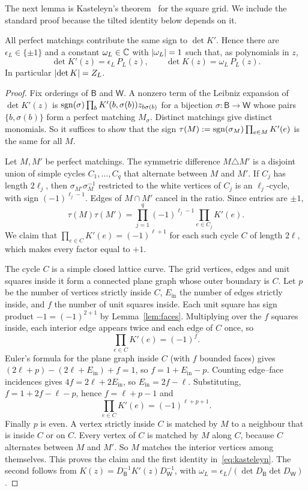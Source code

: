 The next lemma is Kasteleyn's theorem~\cite{Kasteleyn61} for the square grid. We include the standard proof because the tilted identity below depends on it.

\begin{lemma}\label{lem:common-phase}
All perfect matchings contribute the same sign to $\det K'$. Hence there are $\epsilon_L\in\{\pm1\}$ and a constant $\omega_L\in\mathbb{C}$ with $\lvert \omega_L\rvert=1$ such that, as polynomials in $z$,
\begin{equation}\label{eq:kasteleyn}
  \det K'(z)=\epsilon_L\,P_L(z),\qquad \det K(z)=\omega_L\,P_L(z).
\end{equation}
In particular $\lvert \det K\rvert=Z_L$.
\end{lemma}

\begin{proof}
Fix orderings of $\mathsf B$ and $\mathsf W$. A nonzero term of the Leibniz expansion of $\det K'(z)$ is $\operatorname{sgn}(\sigma)\prod_bK'(b,\sigma(b))z_{b\sigma(b)}$ for a bijection $\sigma:\mathsf B\to\mathsf W$ whose pairs $\{b,\sigma(b)\}$ form a perfect matching $M_\sigma$. Distinct matchings give distinct monomials. So it suffices to show that the sign $\tau(M):=\operatorname{sgn}(\sigma_M)\prod_{e\in M}K'(e)$ is the same for all $M$.

Let $M,M'$ be perfect matchings. The symmetric difference $M\triangle M'$ is a disjoint union of simple cycles $C_1,\dots,C_q$ that alternate between $M$ and $M'$. If $C_j$ has length $2\ell_j$, then $\sigma_{M'}\sigma_M^{-1}$ restricted to the white vertices of $C_j$ is an $\ell_j$-cycle, with sign $(-1)^{\ell_j-1}$. Edges of $M\cap M'$ cancel in the ratio. Since entries are $\pm1$,
\[
  \tau(M)\tau(M')=\prod_{j=1}^q(-1)^{\ell_j-1}\prod_{e\in C_j}K'(e).
\]
We claim that $\prod_{e\in C}K'(e)=(-1)^{\ell+1}$ for each such cycle $C$ of length $2\ell$, which makes every factor equal to $+1$.

The cycle $C$ is a simple closed lattice curve. The grid vertices, edges and unit squares inside it form a connected plane graph whose outer boundary is $C$. Let $p$ be the number of vertices strictly inside $C$, $E_{\mathrm{in}}$ the number of edges strictly inside, and $f$ the number of unit squares inside. Each unit square has sign product $-1=(-1)^{2+1}$ by Lemma~\ref{lem:faces}. Multiplying over the $f$ squares inside, each interior edge appears twice and each edge of $C$ once, so
\[
  \prod_{e\in C}K'(e)=(-1)^f .
\]
Euler's formula for the plane graph inside $C$ (with $f$ bounded faces) gives $(2\ell+p)-(2\ell+E_{\mathrm{in}})+f=1$, so $f=1+E_{\mathrm{in}}-p$. Counting edge--face incidences gives $4f=2\ell+2E_{\mathrm{in}}$, so $E_{\mathrm{in}}=2f-\ell$. Substituting, $f=1+2f-\ell-p$, hence $f=\ell+p-1$ and
\[
  \prod_{e\in C}K'(e)=(-1)^{\ell+p+1}.
\]
Finally $p$ is even. A vertex strictly inside $C$ is matched by $M$ to a neighbour that is inside $C$ or on $C$. Every vertex of $C$ is matched by $M$ along $C$, because $C$ alternates between $M$ and $M'$. So $M$ matches the interior vertices among themselves. This proves the claim and the first identity in~\eqref{eq:kasteleyn}. The second follows from $K(z)=D_{\mathsf B}^{-1}K'(z)D_{\mathsf W}^{-1}$, with $\omega_L=\epsilon_L/(\det D_{\mathsf B}\det D_{\mathsf W})$.
\end{proof}

